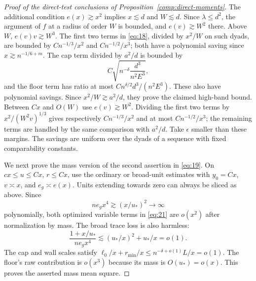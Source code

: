\begin{proof}[Proof of the direct-test conclusions of
Proposition~\ref{comp:direct-moments}]
The additional condition $e(x)\gtrsim x^2$ implies $x\lesssim d$ and
$W\lesssim d$.  Since $\lambda\le d^2$, the argument of $f$ at a
radius of order $W$ is bounded, and $e(v)\gtrsim W^2$ there.  Above
$W$, $e(v)v\gtrsim W^3$.  The first two terms in \eqref{eq:18},
divided by $x^2/W$ on such dyads, are bounded by
$Cn^{-1/3}/x^2$ and $Cn^{-1/2}/x^3$; both have a polynomial saving
since $x\gtrsim n^{-1/6+m}$.  The cap term divided by $a^2/d$ is
bounded by
\[
 C\sqrt{n^{-\delta}\frac{d^3}{n^2E^3}},
\]
and the floor term has ratio at most
$Cn^{\delta/2}d^3/(n^2E^3)$.  These also have polynomial savings.
Since $x^2/W\gtrsim a^2/d$, they prove the claimed high-band bound.
Between $Cx$ and $O(W)$ use $e(v)\gtrsim W^2$.  Dividing the first
two terms by $x^2/(W^2v)^{1/3}$ gives respectively
$Cn^{-1/3}/x^2$ and at most $Cn^{-1/2}/x^3$; the remaining terms are
handled by the same comparison with $a^2/d$.  Take $\epsilon$ smaller
than these margins.  The savings are uniform over the dyads of a
sequence with fixed comparability constants.

We next prove the mass version of the second assertion in
\eqref{eq:19}.  On $cx\le u\le Cx$, $r\le Cx$, use the ordinary
or broad-unit estimates with $y_0=Cx$, $v\asymp x$, and
$e_g\asymp e(x)$.  Units extending towards zero can always be sliced
as above.  Since
\[
 ne_gx^4\gtrsim(x/u_*)^2\longrightarrow\infty
\]
polynomially, both optimized variable terms in \eqref{eq:21} are
$o(x^2)$ after normalization by mass.  The broad trace loss is also
harmless:
\[
 \frac{1+x/u_*}{ne_gx^4}
 \lesssim (u_*/x)^2+u_*/x=o(1).
\]
The cap and wall scales satisfy
$\ell_0/x+r_{\min}/x\le n^{-\delta+o(1)}L/x=o(1)$.
The floor's raw contribution is $o(x^3)$ because its mass is
$O(u_*)=o(x)$.  This proves the asserted mass mean square.


\end{proof}
